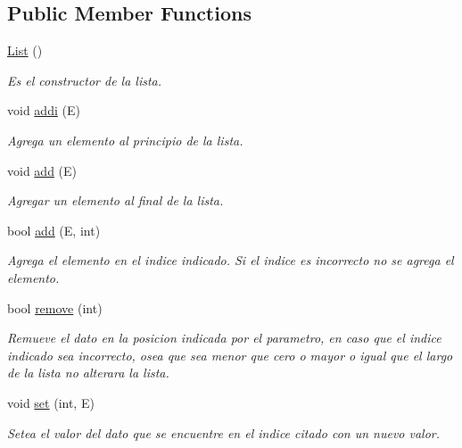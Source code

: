 \subsection*{Public Member Functions}
\begin{DoxyCompactItemize}
\item 
\hypertarget{class_list_ae47afd06bd8c39fe7a12d4489998e7c5}{\hyperlink{class_list_ae47afd06bd8c39fe7a12d4489998e7c5}{List} ()}\label{class_list_ae47afd06bd8c39fe7a12d4489998e7c5}

\begin{DoxyCompactList}\small\item\em Es el constructor de la lista. \end{DoxyCompactList}\item 
void \hyperlink{class_list_a4f0fb366c1153a4fd01826e9e6de5afc}{addi} (E)
\begin{DoxyCompactList}\small\item\em Agrega un elemento al principio de la lista. \end{DoxyCompactList}\item 
void \hyperlink{class_list_a2a130b7bc38cd968136f1f847e42d0cc}{add} (E)
\begin{DoxyCompactList}\small\item\em Agregar un elemento al final de la lista. \end{DoxyCompactList}\item 
bool \hyperlink{class_list_a530267346ebec244900c162de6f467e1}{add} (E, int)
\begin{DoxyCompactList}\small\item\em Agrega el elemento en el indice indicado. Si el indice es incorrecto no se agrega el elemento. \end{DoxyCompactList}\item 
bool \hyperlink{class_list_a46cec78299d3e23469276adf46adf9c1}{remove} (int)
\begin{DoxyCompactList}\small\item\em Remueve el dato en la posicion indicada por el parametro, en caso que el indice indicado sea incorrecto, osea que sea menor que cero o mayor o igual que el largo de la lista no alterara la lista. \end{DoxyCompactList}\item 
void \hyperlink{class_list_ac8b31be96806bd56f655436629ac2e7a}{set} (int, E)
\begin{DoxyCompactList}\small\item\em Setea el valor del dato que se encuentre en el indice citado con un nuevo valor. \end{DoxyCompactList}\item 

\end{DoxyCompactItemize}
